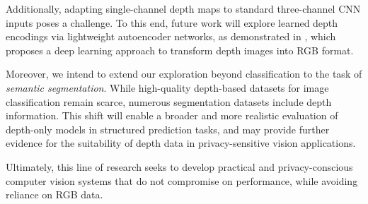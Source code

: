 Additionally, adapting single-channel depth maps to standard three-channel CNN inputs poses a challenge. To this end, future work will explore learned depth encodings via lightweight autoencoder networks, as demonstrated in \cite{carlucci2018de2codeepdepth}, which proposes a deep learning approach to transform depth images into RGB format.

Moreover, we intend to extend our exploration beyond classification to the task of \textit{semantic segmentation}. While high-quality depth-based datasets for image classification remain scarce, numerous segmentation datasets include depth information. This shift will enable a broader and more realistic evaluation of depth-only models in structured prediction tasks, and may provide further evidence for the suitability of depth data in privacy-sensitive vision applications.

Ultimately, this line of research seeks to develop practical and privacy-conscious computer vision systems that do not compromise on performance, while avoiding reliance on RGB data.